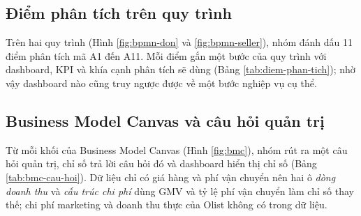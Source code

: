 \subsection{Điểm phân tích trên quy trình}\label{sec:diem-phan-tich}
Trên hai quy trình (Hình \ref{fig:bpmn-don} và \ref{fig:bpmn-seller}), nhóm đánh dấu 11 điểm phân tích mã A1 đến A11. Mỗi điểm gắn một bước của quy trình với dashboard, KPI và khía cạnh phân tích sẽ dùng (Bảng \ref{tab:diem-phan-tich}); nhờ vậy dashboard nào cũng truy ngược được về một bước nghiệp vụ cụ thể.


\subsection{Business Model Canvas và câu hỏi quản trị}\label{sec:bmc-cau-hoi}
Từ mỗi khối của Business Model Canvas (Hình \ref{fig:bmc}), nhóm rút ra một câu hỏi quản trị, chỉ số trả lời câu hỏi đó và dashboard hiển thị chỉ số (Bảng \ref{tab:bmc-cau-hoi}). Dữ liệu chỉ có giá hàng và phí vận chuyển nên hai ô \emph{dòng doanh thu} và \emph{cấu trúc chi phí} dùng GMV và tỷ lệ phí vận chuyển làm chỉ số thay thế; chi phí marketing và doanh thu thực của Olist không có trong dữ liệu.

